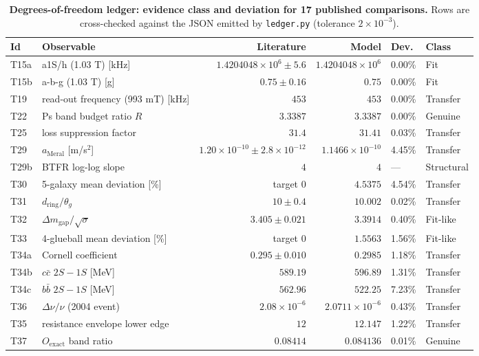 \documentclass[12pt,a4paper]{article}
\begin{document}
\begin{table}[!htbp]
\centering\scriptsize
\setlength{\tabcolsep}{2.5pt}
\renewcommand{\arraystretch}{1.05}
\caption{\textbf{Degrees-of-freedom ledger: evidence class and deviation for
17 published comparisons.} Rows are cross-checked against the JSON emitted
by \texttt{ledger.py} (tolerance $2\times10^{-3}$).}
\label{tab:ledger}
\vspace{0.1cm}
\begin{tabularx}{\textwidth}{@{}lXrrll@{}}
\toprule
Id & Observable & Literature & Model & Dev. & Class \\
\midrule
T15a & a1S/h (1.03 T) [kHz] & $1.4204048\times 10^{6}\pm 5.6$ & $1.4204048\times 10^{6}$ & 0.00\% & Fit \\
T15b & a-b-g (1.03 T) [g] & $0.75\pm 0.16$ & $0.75$ & 0.00\% & Fit \\
T19 & read-out frequency (993 mT) [kHz] & $453$ & $453$ & 0.00\% & Transfer \\
T22 & Ps band budget ratio $R$ & $3.3387$ & $3.3387$ & 0.00\% & Genuine \\
T25 & loss suppression factor & $31.4$ & $31.41$ & 0.03\% & Transfer \\
T29 & $a_{\mathrm{Meral}}$ [m/s$^2$] & $1.20\times 10^{-10}\pm 2.8\times 10^{-12}$ & $1.1466\times 10^{-10}$ & 4.45\% & Transfer \\
T29b & BTFR log-log slope & $4$ & $4$ & --- & Structural \\
T30 & 5-galaxy mean deviation [\%] & target 0 & $4.5375$ & 4.54\% & Transfer \\
T31 & $d_{\mathrm{ring}}/\theta_g$ & $10\pm 0.4$ & $10.002$ & 0.02\% & Transfer \\
T32 & $\Delta m_{\mathrm{gap}}/\sqrt{\sigma}$ & $3.405\pm 0.021$ & $3.3914$ & 0.40\% & Fit-like \\
T33 & 4-glueball mean deviation [\%] & target 0 & $1.5563$ & 1.56\% & Fit-like \\
T34a & Cornell coefficient & $0.295\pm 0.010$ & $0.2985$ & 1.18\% & Transfer \\
T34b & $c\bar{c}$ $2S-1S$ [MeV] & $589.19$ & $596.89$ & 1.31\% & Transfer \\
T34c & $b\bar{b}$ $2S-1S$ [MeV] & $562.96$ & $522.25$ & 7.23\% & Transfer \\
T36 & $\Delta\nu/\nu$ (2004 event) & $2.08\times 10^{-6}$ & $2.0711\times 10^{-6}$ & 0.43\% & Transfer \\
T35 & resistance envelope lower edge & $12$ & $12.147$ & 1.22\% & Transfer \\
T37 & $O_{\mathrm{exact}}$ band ratio & $0.08414$ & $0.084136$ & 0.01\% & Genuine \\
\bottomrule
\end{tabularx}
\end{table}
\end{document}

